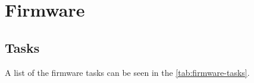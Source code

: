%
%
%
%
%

%
%
%
%
%
%

\chapter{Firmware} \label{ch:firmware}

\section{Tasks}

A list of the firmware tasks can be seen in the \autoref{tab:firmware-tasks}.

